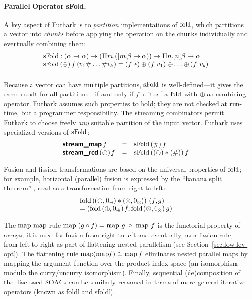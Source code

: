 \paragraph{Parallel Operator sFold.}
A key aspect of Futhark is to \emph{partition} implementations of $\mathrm{fold}$,
which partitions a vector into \emph{chunks} before applying the operation
on the chunks individually and eventually combining them:
\[ \begin{array}{l}
\mathrm{sFold} : (\alpha \to \alpha) \to (\Pi m. ([m]\beta \to \alpha)) \to \Pi n. [n]\beta \to \alpha \\
\mathrm{sFold} \, (\oplus) \, f \, (v_1 \# \ldots \# v_k) = (f~\epsilon) \oplus (f~v_1) \oplus \ldots \oplus (f~v_k) \\[1em]
\end{array} \]
%
Because a vector can have multiple partitions, $\mathrm{sFold}$ is well-defined---it
gives the same result for all partitions---if and only if $f$ is itself a $\mathrm{fold}$
with $\oplus$ as combining operator.
%
Futhark assumes such properties to hold; they are not checked at run-time,
but a programmer responsibility.   The streaming combinators
permit Futhark to choose freely \emph{any} suitable partition of the input vector.
Futhark uses specialized versions of $\mathrm{sFold}$: %
\[ \begin{array}{lcl}
\mbox{\textsf{\bfseries{stream\_map}}}\, f & = &  \mathrm{sFold} \, (\#) \, f \\
\mbox{\textsf{\bfseries{stream\_red}}}\, (\oplus) \, f & = & \mathrm{sFold} \, ((\oplus) * (\#)) \, f
\end{array} \]

Fusion and fission transformations are based on the universal
properties of $\mathrm{fold}$; for example, horizontal (parallel) fusion is
expressed by the ``banana split theorem'' \cite{mfp91}, read as a
transformation from right to left:
\[
   \begin{array}{l}
  \mathrm{fold}\, ((\oplus, 0_{\oplus}) * (\otimes, 0_{\otimes})) ~ (f, g) \\=(\mathrm{fold}\, (\oplus, 0_{\oplus})\, f, \mathrm{fold}\, (\otimes,
     0_{\otimes})\, g )
   \end{array}
\]

The $\mathrm{map}$-$\mathrm{map}$ rule $\mathrm{map} ~ (g \circ f) = \mathrm{map} ~ g ~ \circ ~ \mathrm{map} ~ f$
is the functorial property of arrays; it is used for fusion from right
to left and eventually, as a fission rule, from left to right as part
of flattening nested parallelism (see Section~\ref{sec:low-lev-opt}).
%
The flattening rule
$ \mathrm{map} (\mathrm{map} f) \cong \mathrm{map} \,f$
eliminates nested parallel maps by mapping the argument function over
the product index space (an isomorphism modulo the
curry/uncurry isomorphism).
Finally, sequential (de)composition of the discussed SOACs
can be similarly reasoned in terms of more general iterative operators
(known as foldl and sfoldl).


